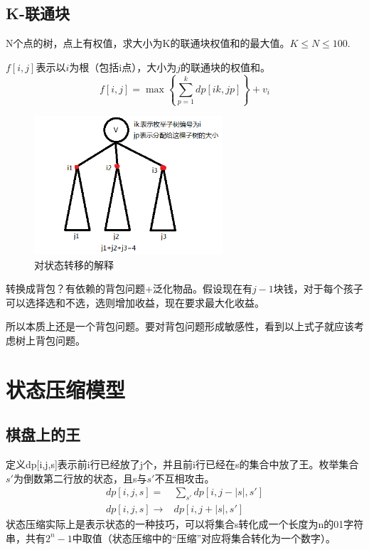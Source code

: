 \subsection{K-联通块}
N个点的树，点上有权值，求大小为K的联通块权值和的最大值。$K\le N\le 100.$

$f[i,j]$表示以$i$为根（包括i点），大小为$j$的联通块的权值和。
\begin{equation*}
    f[i,j]=\max\left\{\sum_{p=1}^kdp[ik,jp]\right\}+v_i
\end{equation*}
\begin{figure}[h]
    \begin{center}
        \includegraphics[width=7cm]{transtotikz.png}
    \end{center}
    \caption{对状态转移的解释}
    \label{fig. 1.1}
\end{figure}

转换成背包？有依赖的背包问题+泛化物品。假设现在有$j-1$块钱，对于每个孩子可以选择选和不选，选则增加收益，现在要求最大化收益。

所以本质上还是一个背包问题。要对背包问题形成敏感性，看到以上式子就应该考虑树上背包问题。

\section{状态压缩模型}
\subsection{棋盘上的王}
定义dp[i,j,s]表示前i行已经放了j个，并且前i行已经在s的集合中放了王。枚举集合$s'$为倒数第二行放的状态，且s与$s'$不互相攻击。
\begin{equation*}
    \begin{aligned}
        dp[i,j,s]=&\sum_{s'}dp[i,j-|s|,s']\\
        dp[i,j,s]\to& dp[i,j+|s|,s']
    \end{aligned}
\end{equation*}
状态压缩实际上是表示状态的一种技巧，可以将集合s转化成一个长度为n的01字符串，共有$2^n-1$中取值（状态压缩中的“压缩”对应将集合转化为一个数字）。

